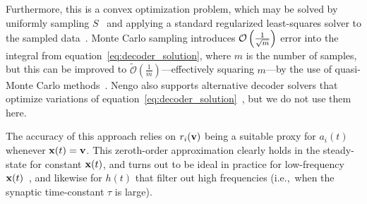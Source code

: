 Furthermore, this is a convex optimization problem, which may be solved by uniformly sampling $S$~\citep{voelker2017} and applying a standard regularized least-squares solver to the sampled data~\citep{bekolay2013}.
Monte Carlo sampling introduces $\mathcal{O}\left({ \frac{1}{\sqrt{m}} }\right)$ error into the integral from equation~\ref{eq:decoder_solution}, where $m$ is the number of samples, but this can be improved to $\widetilde{\mathcal{O}} \left( \frac{1}{m} \right)$---effectively squaring $m$---by the use of quasi-Monte Carlo methods~\citep{fang1994, voelker2016b}.
Nengo also supports alternative decoder solvers that optimize variations of equation~\ref{eq:decoder_solution}~\citep[e.g.,][]{voelker2016a, abrams2017}, but we do not use them here.


The accuracy of this approach relies on $r_i(\mathbf{v})$ being a suitable proxy for $a_i(t)$ whenever $\mathbf{x}(t) = \mathbf{v}$.
This zeroth-order approximation clearly holds in the steady-state for constant $\mathbf{x}(t)$, and turns out to be ideal in practice for low-frequency $\mathbf{x}(t)$~\citep[][appendix~F.1]{eliasmith2003a}, and likewise for $h(t)$ that filter out high frequencies (i.e.,~when the synaptic time-constant $\tau$ is large).

